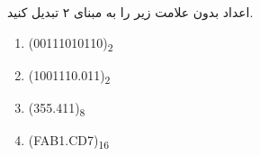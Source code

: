 اعداد بدون علامت زیر را به مبنای ۲ تبدیل کنید.

\begin{latin}
	\begin{enumerate}
		\item 
		(00111010110)\textsubscript{2}

		\item 
		(1001110.011)\textsubscript{2}
		
		\item 
		(355.411)\textsubscript{8}
		
		\item 
		(FAB1.CD7)\textsubscript{16}
	\end{enumerate}
\end{latin}